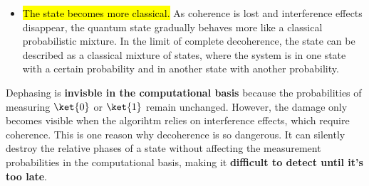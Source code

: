 \begin{itemize}
    On the other hand, when the two waves are out of phase (peaks align with valleys), their amplitudes cancel each other out, leading to a weaker overall amplitude, and therefore a lower probability of certain measurement outcomes.

    \begin{center}
    \end{center}
    
    \textcolor{Red2}{ \textbf{Decoherence and interference.}} Decoherence does not necessarily destroy the probabilities immediately. Instead, it destroys the \textbf{phase information}. Without phase information, interference effects disappear, and the quantum state behaves more like a classical probabilistic system. 
    
    \item \hl{The state becomes more classical.} As coherence is lost and interference effects disappear, the quantum state gradually behaves more like a classical probabilistic mixture. In the limit of complete decoherence, the state can be described as a classical mixture of states, where the system is in one state with a certain probability and in another state with another probability.
\end{itemize}
Dephasing is \textbf{invisble in the computational basis} because the probabilities of measuring $\ket{0}$ or $\ket{1}$ remain unchanged. However, the damage only becomes visible when the algorihtm relies on interference effects, which require coherence. This is one reason why decoherence is so dangerous. It can silently destroy the relative phases of a state without affecting the measurement probabilities in the computational basis, making it \textbf{difficult to detect until it's too late}.

